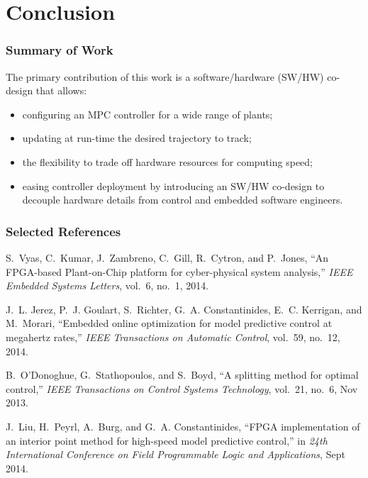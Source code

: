 \documentclass{beamer}
\begin{document}





\section{Conclusion}
\begin{frame}
\frametitle{Summary of Work}
The primary contribution of this work is a software/hardware (SW/HW) co-design that allows:
\begin{itemize}
\item configuring an MPC controller for a wide range of plants;
\item updating at run-time the desired trajectory to track;
\item the flexibility to trade off hardware resources for computing speed;
\item easing controller deployment by introducing an SW/HW co-design to decouple hardware details from control and embedded software engineers.
\end{itemize}

\end{frame}













\begin{frame}
\frametitle{Selected References}
\footnotesize{
\begin{thebibliography}{99} %

S.~Vyas, C.~Kumar, J.~Zambreno, C.~Gill, R.~Cytron, and P.~Jones, ``An
  {FPGA}-based {Plant-on-Chip} platform for cyber-physical system analysis,''
  \emph{IEEE Embedded Systems Letters}, vol.~6, no.~1, 2014.

J.~L. Jerez, P.~J. Goulart, S.~Richter, G.~A. Constantinides, E.~C. Kerrigan,
  and M.~Morari, ``Embedded online optimization for model predictive control at
  megahertz rates,'' \emph{IEEE Transactions on Automatic Control}, vol.~59,
  no.~12, 2014.

B.~O'Donoghue, G.~Stathopoulos, and S.~Boyd, ``A splitting method for optimal
  control,'' \emph{IEEE Transactions on Control Systems Technology}, vol.~21,
  no.~6, Nov 2013.

J.~Liu, H.~Peyrl, A.~Burg, and G.~A. Constantinides, ``{FPGA} implementation of
  an interior point method for high-speed model predictive control,'' in
  \emph{24th International Conference on Field Programmable Logic and
  Applications}, Sept 2014.


\end{thebibliography}
}
\end{frame}
\end{document}
